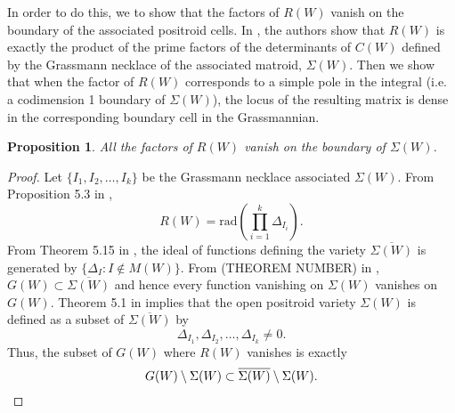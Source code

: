 \documentclass[11pt]{article}
\newtheorem{prop}[thm]{Proposition}
\theoremstyle{remark}
\theoremstyle{definition}
\begin{document}
In order to do this, we to show that the factors of $R(W)$ vanish on the boundary of the associated positroid cells. In \cite{generalcombinatoricsII}, the authors show that $R(W)$ is exactly the product of the prime factors of the determinants of $C(W)$ defined by the Grassmann necklace of the associated matroid, $\Sigma(W)$. Then we show that when the factor of $R(W)$ corresponds to a simple pole in the integral (i.e. a codimension 1 boundary of $\Sigma(W)$), the locus of the resulting matrix is dense in the corresponding boundary cell in the Grassmannian.

\begin{prop}\label{res:vanishonbdny}
All the factors of $R(W)$ vanish on the boundary of $\Sigma(W)$.
\end{prop}


\begin{proof}
Let $\{I_1, I_2, \dots, I_k\}$ be the Grassmann necklace associated $\Sigma(W)$. From Proposition 5.3 in \cite{generalcombinatoricsII},
%
\begin{displaymath}
R(W) = \mathrm{rad}\left(\prod_{i = 1}^{k} \Delta_{I_i}\right).
\end{displaymath}
%
From Theorem 5.15 in \cite{knutsonlamspeyerjuggling}, the ideal of functions defining the variety $\overline{\Sigma(W)}$ is generated by $\{\Delta_I : I \notin M(W)\}$. From (THEOREM NUMBER) in \cite{basisshapeloci}, $G(W) \subset \overline{\Sigma(W)}$ and hence every function vanishing on $\Sigma(W)$ vanishes on $G(W)$. Theorem 5.1 in \cite{knutsonlamspeyerjuggling} implies that the open positroid variety $\Sigma(W)$ is defined as a subset of $\overline{\Sigma(W)}$ by
%
\begin{displaymath}
\Delta_{I_1}, \Delta_{I_2}, \dots, \Delta_{I_k} \neq 0.
\end{displaymath}
%
Thus, the subset of $G(W)$ where $R(W)$ vanishes is exactly
%
\begin{displaymath}
G(W) \setminus \Sigma(W) \subset \overline{\Sigma(W)} \setminus \Sigma(W). \qedhere
\end{displaymath}
\end{proof}
\end{document}
